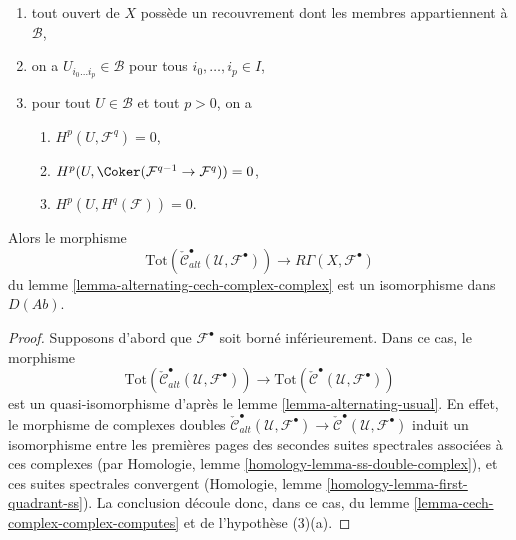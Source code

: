 {\begin{lemma}
\begin{enumerate}

\item tout ouvert de $X$ possède un recouvrement dont les membres appartiennent à $\mathcal{B}$,
\item on a $U_{i_0\ldots i_p} \in \mathcal{B}$ pour tous
$i_0, \ldots, i_p \in I$,
\item pour tout $U \in \mathcal{B}$ et tout $p > 0$, on a

\begin{enumerate}

\item  $H^p(U, \mathcal{F}^q) = 0$,
\item  $H^p(U, \Coker(\mathcal{F}^{q - 1} \to \mathcal{F}^q)) = 0$,
\item  $H^p(U, H^q(\mathcal{F})) = 0$.

\end{enumerate}

\end{enumerate}

Alors le morphisme
$$
\text{Tot}(\check{\mathcal{C}}^\bullet_{alt}(\mathcal{U}, \mathcal{F}^\bullet))
\longrightarrow
R\Gamma(X, \mathcal{F}^\bullet)
$$
du lemme \ref{lemma-alternating-cech-complex-complex}
est un isomorphisme dans $D(\textit{Ab})$.

\end{lemma}

\begin{proof}
Supposons d'abord que $\mathcal{F}^\bullet$ soit borné inférieurement. Dans ce cas, le morphisme $$
\text{Tot}(\check{\mathcal{C}}^\bullet_{alt}(\mathcal{U}, \mathcal{F}^\bullet))
\longrightarrow
\text{Tot}(\check{\mathcal{C}}^\bullet(\mathcal{U}, \mathcal{F}^\bullet))
$$ est un quasi-isomorphisme d'après le lemme \ref{lemma-alternating-usual}. En effet, le morphisme de complexes doubles $\check{\mathcal{C}}^\bullet_{alt}(\mathcal{U}, \mathcal{F}^\bullet) \to
\check{\mathcal{C}}^\bullet(\mathcal{U}, \mathcal{F}^\bullet)$ induit un isomorphisme entre les premières pages des secondes suites spectrales associées à ces complexes (par Homologie, lemme \ref{homology-lemma-ss-double-complex}), et ces suites spectrales convergent (Homologie, lemme \ref{homology-lemma-first-quadrant-ss}). La conclusion découle donc, dans ce cas, du lemme \ref{lemma-cech-complex-complex-computes} et de l'hypothèse (3)(a).

\medskip\noindent


\end{proof}}
